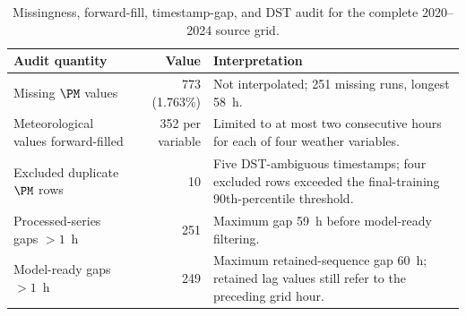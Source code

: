 \begin{table}[H]
\centering
\caption{{Missingness, forward-fill, timestamp-gap, and DST audit for the complete 2020--2024 source grid.}\label{tab:s9-missingness}}
\small
\begin{tabularx}{\textwidth}{l r X}
\toprule
Audit quantity & Value & Interpretation\\
\midrule
Missing $\PM$ values & 773 (1.763\%) & Not interpolated; 251 missing runs, longest 58~h.\\
Meteorological values forward-filled & 352 per variable & Limited to at most two consecutive hours for each of four weather variables.\\
Excluded duplicate $\PM$ rows & 10 & Five DST-ambiguous timestamps; four excluded rows exceeded the final-training 90th-percentile threshold.\\
Processed-series gaps $>1$~h & 251 & Maximum gap 59~h before model-ready filtering.\\
Model-ready gaps $>1$~h & 249 & Maximum retained-sequence gap 60~h; retained lag values still refer to the preceding grid hour.\\
\bottomrule
\end{tabularx}
\end{table}
